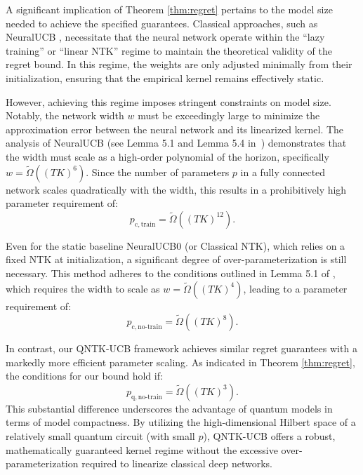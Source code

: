 \documentclass[pdflatex,sn-mathphys-num]{sn-jnl}%
\theoremstyle{thmstyleone}%
\theoremstyle{thmstyletwo}%
\theoremstyle{thmstylethree}%
\begin{document}

A significant implication of Theorem \ref{thm:regret} pertains to the model size needed to achieve the specified guarantees. Classical approaches, such as NeuralUCB \cite{neuralucb}, necessitate that the neural network operate within the ``lazy training'' or ``linear NTK'' regime to maintain the theoretical validity of the regret bound. In this regime, the weights are only adjusted  minimally from their initialization, ensuring that the empirical kernel remains effectively static.

However, achieving this regime imposes stringent constraints on model size. Notably, the network width $w$ must be exceedingly large to minimize the approximation error between the neural network and its linearized kernel. The analysis of NeuralUCB (see Lemma 5.1 and Lemma 5.4 in~\cite{neuralucb}) demonstrates that the width must scale as a high-order polynomial of the horizon, specifically $w = \tilde{\Omega}\left((TK)^6\right)$. Since the number of parameters $p$ in a fully connected network scales quadratically with the width, this results in a prohibitively high parameter requirement of:
$$p_{\mathrm{c},\mathrm{train}}=\tilde{\Omega}\left((TK)^{12}\right).$$  

Even for the static baseline NeuralUCB0 (or Classical NTK), which relies on a fixed NTK at initialization, a significant degree of over-parameterization is still necessary. This method adheres to the conditions outlined in Lemma 5.1 of \cite{neuralucb}, which requires the width to scale as $w = \tilde{\Omega}((TK)^4)$, leading to a parameter requirement of:
$$p_{ \mathrm{c}, \mathrm{no}\text{-}\mathrm{train}}=\tilde{\Omega}\left((TK)^{8}\right).$$

In contrast, our QNTK-UCB framework achieves similar regret guarantees with a markedly more efficient parameter scaling. As indicated in Theorem \ref{thm:regret}, the conditions for our bound hold if: $$p_{ \mathrm{q}, \mathrm{no}\text{-}\mathrm{train}} =\tilde{\Omega}\left((TK)^3\right).$$
This substantial difference underscores the advantage of quantum models in terms of model compactness. By utilizing the high-dimensional Hilbert space of a relatively small quantum circuit (with small \(p\)), QNTK-UCB offers a robust, mathematically guaranteed kernel regime without the excessive over-parameterization required to linearize classical deep networks.
\end{document}
